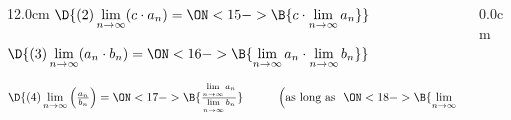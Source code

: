 \begin{frame}
\begin{columns}
\begin{column}{12.0cm}
$\D{
(2) \lim \limits_{n \to \infty} (c \cdot a_n) = 
\ON<15->{\B{c \cdot \lim \limits_{n \to \infty} a_n}}}$

\vspace{0.2cm}

$\D{
(3) \lim \limits_{n \to \infty} (a_n \cdot b_n) = 
\ON<16->{\B{\lim \limits_{n \to \infty} a_n \cdot \lim \limits_{n \to \infty} b_n}}}$

$\D{
(4) \lim \limits_{n \to \infty} \left(\frac{a_n}{b_n}\right) = 
\ON<17->{\B{\frac{\lim \limits_{n \to \infty} a_n}{\lim \limits_{n \to \infty} b_n}}} \hspace{1.0cm} \left(\text{as long as } \,\, 
\ON<18->{\B{\lim \limits_{n \to \infty} b_n \ne 0}}\right)}$

\vspace{0.5cm}


\end{column}
\begin{column}{0.0cm}\end{column}
\end{columns}
\end{frame}

%
%
%
%
%
%
%	

